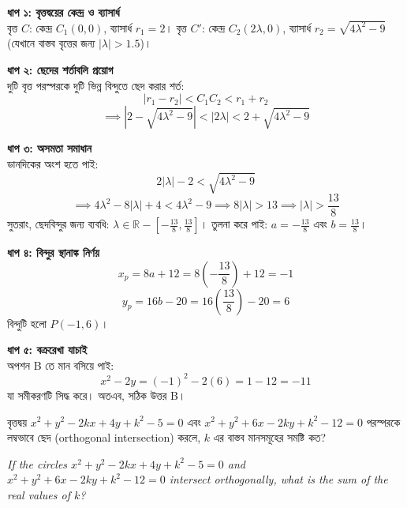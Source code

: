 \documentclass[12pt, a4paper]{article}
\begin{document}
\begin{tcolorbox}[solutionbox={সমাধান (Solution)}]
    \noindent
    \textbf{ধাপ ১: বৃত্তদ্বয়ের কেন্দ্র ও ব্যাসার্ধ} \\
    বৃত্ত $C$: কেন্দ্র $C_1(0,0)$, ব্যাসার্ধ $r_1 = 2$। 
    বৃত্ত $C'$: কেন্দ্র $C_2(2\lambda, 0)$, ব্যাসার্ধ $r_2 = \sqrt{4\lambda^2 - 9}$ (যেখানে বাস্তব বৃত্তের জন্য $|\lambda| > 1.5$)।
    
    \vspace{0.5em}
    \noindent\textbf{ধাপ ২: ছেদের শর্তাবলি প্রয়োগ} \\
    দুটি বৃত্ত পরস্পরকে দুটি ভিন্ন বিন্দুতে ছেদ করার শর্ত: 
    \[ |r_1 - r_2| < C_1C_2 < r_1 + r_2 \]
    \[ \implies |2 - \sqrt{4\lambda^2 - 9}| < |2\lambda| < 2 + \sqrt{4\lambda^2 - 9} \]
    
    \vspace{0.5em}
    \noindent\textbf{ধাপ ৩: অসমতা সমাধান} \\
    ডানদিকের অংশ হতে পাই:
    \[ 2|\lambda| - 2 < \sqrt{4\lambda^2 - 9} \]
    \[ \implies 4\lambda^2 - 8|\lambda| + 4 < 4\lambda^2 - 9 \implies 8|\lambda| > 13 \implies |\lambda| > \frac{13}{8} \]
    সুতরাং, ছেদবিন্দুর জন্য ব্যবধি: $\lambda \in \mathbb{R} - \left[-\frac{13}{8}, \frac{13}{8}\right]$। 
    তুলনা করে পাই: $a = -\frac{13}{8}$ এবং $b = \frac{13}{8}$।
    
    \vspace{0.5em}
    \noindent\textbf{ধাপ ৪: বিন্দুর স্থানাঙ্ক নির্ণয়} \\
    \[ x_p = 8a + 12 = 8\left(-\frac{13}{8}\right) + 12 = -1 \]
    \[ y_p = 16b - 20 = 16\left(\frac{13}{8}\right) - 20 = 6 \]
    বিন্দুটি হলো $P(-1, 6)$।
    
    \vspace{0.5em}
    \noindent\textbf{ধাপ ৫: বক্ররেখা যাচাই} \\
    অপশন B তে মান বসিয়ে পাই:
    \[ x^2 - 2y = (-1)^2 - 2(6) = 1 - 12 = -11 \]
    যা সমীকরণটি সিদ্ধ করে। অতএব, সঠিক উত্তর B।
\end{tcolorbox}

\begin{tcolorbox}[questionbox={প্রশ্ন (Question) 6}]
    \noindent
    বৃত্তদ্বয় $x^2 + y^2 - 2kx + 4y + k^2 - 5 = 0$ এবং $x^2 + y^2 + 6x - 2ky + k^2 - 12 = 0$ পরস্পরকে লম্বভাবে ছেদ (orthogonal intersection) করলে, $k$ এর বাস্তব মানসমূহের সমষ্টি কত?
    
    \vspace{0.8em}
    \begin{english}
    \noindent\textit{\color{darkgray}
    If the circles $x^2 + y^2 - 2kx + 4y + k^2 - 5 = 0$ and $x^2 + y^2 + 6x - 2ky + k^2 - 12 = 0$ intersect orthogonally, what is the sum of the real values of $k$?
    }
    \end{english}
\end{tcolorbox}
\end{document}
